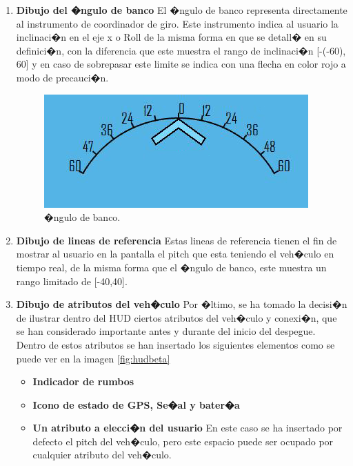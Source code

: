 \begin{enumerate}
\begin{enumerate}
\begin{enumerate}
			
		\end{enumerate}
		
	\end{enumerate}%
	
	\item \textbf{Dibujo del �ngulo de banco}
	El �ngulo de banco representa directamente al instrumento de coordinador de giro. Este instrumento indica al usuario la inclinaci�n en el eje x o Roll de la misma forma en que se detall� en su definici�n, con la diferencia que este muestra el rango de inclinaci�n [-(-60), 60] y en caso de sobrepasar este limite se indica con una flecha en color rojo a modo de precauci�n. 
	\begin{figure}[h]
		\centering
		\includegraphics[width=0.4\linewidth, height=0.1\textheight]{Imagenes/angulo}
		\caption{�ngulo de banco.}
		\label{fig:angulo}
	\end{figure}
	
	
	\item \textbf{Dibujo de lineas de referencia}
	Estas lineas de referencia tienen el fin de mostrar al usuario en la pantalla el pitch que esta teniendo el veh�culo en tiempo real, de la misma forma que el �ngulo de banco, este muestra un rango limitado de [-40,40].
	
	\item \textbf{Dibujo de atributos del veh�culo}
	Por �ltimo, se ha tomado la decisi�n de ilustrar dentro del HUD ciertos atributos del veh�culo y conexi�n, que se han considerado importante antes y durante del inicio del despegue. Dentro de estos atributos se han insertado los siguientes elementos como se puede ver en la imagen \ref{fig:hudbeta}
	
	\begin{itemize}
		
		\item \textbf{Indicador de rumbos}
		\item \textbf{Icono de estado de GPS, Se�al y bater�a}
		\item \textbf{Un atributo a elecci�n del usuario} En este caso se ha insertado por defecto el pitch del veh�culo, pero este espacio puede ser ocupado por cualquier atributo del veh�culo. 
		

\end{itemize}
\end{enumerate}
